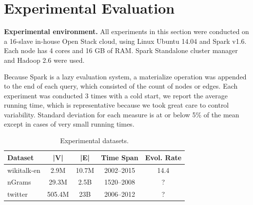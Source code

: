 \section{Experimental Evaluation}
\label{sec:exp}

{\bf Experimental environment.} All experiments in this section were
conducted on a 16-slave in-house Open Stack cloud, using Linux Ubuntu
14.04 and Spark v1.6.  Each node has 4 cores and 16 GB of RAM.  Spark
Standalone cluster manager and Hadoop 2.6 were used.

Because Spark is a lazy evaluation system, a materialize operation was
appended to the end of each query, which consisted of the count of
nodes or edges.  Each experiment was conducted 3 times with a cold
start, we report the average running time, which is representative
because we took great care to control variability.  Standard deviation
for each measure is at or below 5\% of the mean except in cases of
very small running times.

\begin{table}
\caption{Experimental datasets.}
\small
\begin{tabular}{l | c | c | c | c }
\hline
\multicolumn{1}{l|}{\bfseries Dataset} & \multicolumn{1}{c|}{\bfseries |V|} & \multicolumn{1}{c|}{\bfseries |E|} & \multicolumn{1}{c|}{\bfseries Time Span} & \multicolumn{1}{c}{\bfseries Evol. Rate} \\ \hline
wikitalk-en & 2.9M & 10.7M & 2002--2015 & 14.4 \\ \hline
nGrams & 29.3M & 2.5B & 1520--2008 & ? \\ \hline
twitter & 505.4M & 23B & 2006--2012 & ? \\ \hline
\end{tabular}
\label{tab:datasets}
\end{table}

